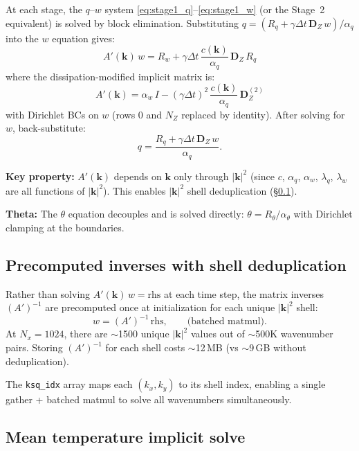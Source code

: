 \documentclass[11pt]{article}
\newcommand{\kh}{|\bm{k}|}
\newcommand{\Dvec}{\bm{D}}
\begin{document}
At each stage, the $q$--$w$ system \eqref{eq:stage1_q}--\eqref{eq:stage1_w} (or the Stage~2 equivalent) is solved by block elimination. Substituting $q = (R_q + \gamma\Delta t\,\Dvec_Z\,w)/\alpha_q$ into the $w$ equation gives:
\begin{equation}
\boxed{
A'(\bm{k})\,w = R_w + \gamma\Delta t\,\frac{c(\bm{k})}{\alpha_q}\,\Dvec_Z\,R_q
}
\label{eq:w_system}
\end{equation}
where the dissipation-modified implicit matrix is:
\begin{equation}
\boxed{
A'(\bm{k}) = \alpha_w\,I - (\gamma\Delta t)^2\,\frac{c(\bm{k})}{\alpha_q}\,\Dvec_Z^{(2)}
}
\label{eq:A_prime}
\end{equation}
with Dirichlet BCs on $w$ (rows $0$ and $N_Z$ replaced by identity). After solving for $w$, back-substitute:
\begin{equation}
q = \frac{R_q + \gamma\Delta t\,\Dvec_Z\,w}{\alpha_q}.
\label{eq:q_backsub}
\end{equation}

\noindent\textbf{Key property:} $A'(\bm{k})$ depends on $\bm{k}$ only through $\kh^2$ (since $c$, $\alpha_q$, $\alpha_w$, $\lambda_q$, $\lambda_w$ are all functions of $\kh^2$). This enables $|\bm{k}|^2$ shell deduplication (\S\ref{sec:shells}).

\noindent\textbf{Theta:} The $\theta$ equation decouples and is solved directly: $\theta = R_\theta/\alpha_\theta$ with Dirichlet clamping at the boundaries.

\subsection{Precomputed inverses with shell deduplication}
\label{sec:shells}

Rather than solving $A'(\bm{k})\,w = \text{rhs}$ at each time step, the matrix inverses $(A')^{-1}$ are precomputed once at initialization for each unique $\kh^2$ shell:
\begin{equation}
w = (A')^{-1}\,\text{rhs}, \qquad\text{(batched matmul)}.
\end{equation}
At $N_x = 1024$, there are $\sim$1500 unique $\kh^2$ values out of $\sim$500K wavenumber pairs. Storing $(A')^{-1}$ for each shell costs $\sim$12\,MB (vs $\sim$9\,GB without deduplication).

The \texttt{ksq\_idx} array maps each $(k_x, k_y)$ to its shell index, enabling a single gather + batched matmul to solve all wavenumbers simultaneously.

\subsection{Mean temperature implicit solve}
\label{sec:mean_temp_imex}
\end{document}
